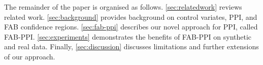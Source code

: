 The remainder of the paper is organised as follows. \cref{sec:relatedwork} reviews related work. \cref{sec:background} provides background on control variates, PPI, and FAB confidence regions. \cref{sec:fab-ppi} describes our novel approach for PPI, called FAB-PPI. \cref{sec:experiments} demonstrates the benefits of FAB-PPI on synthetic and real data. Finally, \cref{sec:discussion} discusses limitations and further extensions of our approach.
